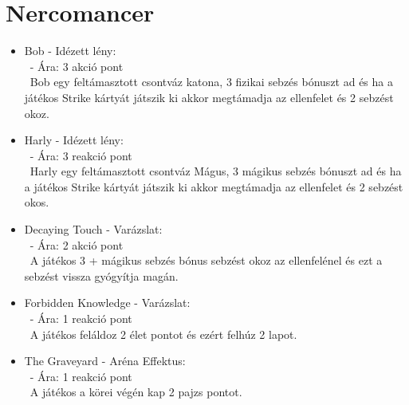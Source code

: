\section{Nercomancer}
\begin{itemize}
    \item Bob - Idézett lény:\\\
    - Ára: 3 akció pont \\\
    Bob egy feltámasztott csontváz katona, 3 fizikai sebzés bónuszt ad és ha a játékos Strike kártyát játszik ki akkor megtámadja az ellenfelet és 2 sebzést okoz.
    \item Harly - Idézett lény:\\\
    - Ára: 3 reakció pont \\\
    Harly egy feltámasztott csontváz Mágus, 3 mágikus sebzés bónuszt ad és ha a játékos Strike kártyát játszik ki akkor megtámadja az ellenfelet és 2 sebzést okos.
    \item Decaying Touch - Varázslat:\\\
    - Ára: 2 akció pont \\\
    A játékos 3 + mágikus sebzés bónus sebzést okoz az ellenfelénel és ezt a sebzést vissza gyógyítja magán.
    \item Forbidden Knowledge - Varázslat:\\\
    - Ára: 1 reakció pont \\\
    A játékos feláldoz 2 élet pontot és ezért felhúz 2 lapot.
    \item The Graveyard - Aréna Effektus:\\\
    - Ára: 1 reakció pont \\\
    A játékos a körei végén kap 2 pajzs pontot.
\end{itemize}

